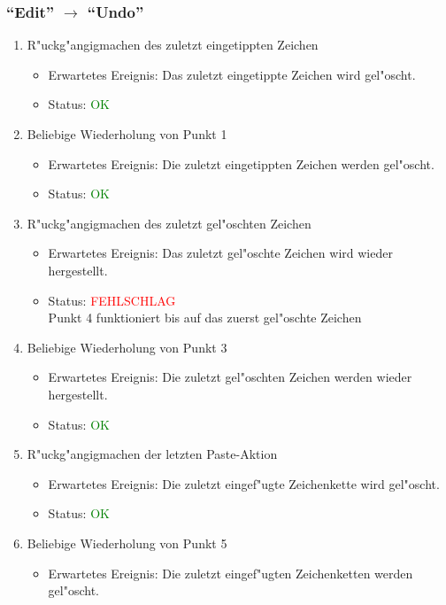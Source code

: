 \subsubsection{"`Edit"' $\rightarrow$ "`Undo"'}
\begin{enumerate}
\item R"uckg"angigmachen des zuletzt eingetippten Zeichen
\begin{itemize}
\item Erwartetes Ereignis: Das zuletzt eingetippte Zeichen wird gel"oscht. 
\item Status: \textcolor{green}{OK}
\end{itemize}
\item Beliebige Wiederholung von Punkt 1
\begin{itemize}
\item Erwartetes Ereignis: Die zuletzt eingetippten Zeichen werden gel"oscht. 
\item Status: \textcolor{green}{OK}
\end{itemize}
\item R"uckg"angigmachen des zuletzt gel"oschten Zeichen
\begin{itemize}
\item Erwartetes Ereignis: Das zuletzt gel"oschte Zeichen wird wieder hergestellt. 
\item Status: \textcolor{red}{FEHLSCHLAG} \\
Punkt 4 funktioniert bis auf das zuerst gel"oschte Zeichen
\end{itemize}
\item Beliebige Wiederholung von Punkt 3
\begin{itemize}
\item Erwartetes Ereignis: Die zuletzt gel"oschten Zeichen werden wieder hergestellt. 
\item Status: \textcolor{green}{OK}
\end{itemize}
\item R"uckg"angigmachen der letzten Paste-Aktion
\begin{itemize}
\item Erwartetes Ereignis: Die zuletzt eingef"ugte Zeichenkette wird gel"oscht. 
\item Status: \textcolor{green}{OK}
\end{itemize}
\item Beliebige Wiederholung von Punkt 5
\begin{itemize}
\item Erwartetes Ereignis: Die zuletzt eingef"ugten Zeichenketten werden gel"oscht. 

\end{itemize}
\end{enumerate}
